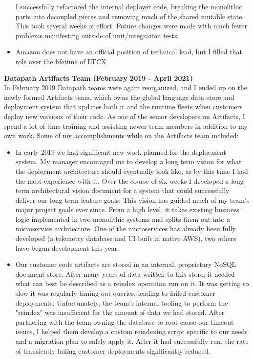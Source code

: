 \documentclass{res}
\begin{document}
\begin{resume}
\begin{itemize}
   I successfully refactored the internal deployer code, breaking the monolithic parts into decoupled pieces and removing much of the shared mutable state.  This took several weeks of effort.  Future changes were made with much fewer problems manifesting outside of unit/integration tests.
   \item Amazon does not have an official position of technical lead, but I filled that role over the lifetime of LTCX
   \end{itemize}
   {\bf Datapath Artifacts Team (February 2019 - April 2021) }\\
   In February 2019 Datapath teams were again reorganized, and I ended up on the newly formed Artifacts team, which owns the global language data store and deployment system that updates both it and the runtime fleets when customers deploy new versions of their code.  As one of the senior developers on Artifacts, I spend a lot of time training and assisting newer team members in addition to my own work.  Some of my accomplishments while on the Artifacts team included:
   \begin{itemize}
   \item In early 2019 we had significant new work planned for the deployment system.  My manager encouraged me to develop a long term vision for what the deployment architecture should eventually look like, as by this time I had the most experience with it.  Over the course of six weeks I developed a long term architectural vision document for a system that could successfully deliver our long term feature goals.  This vision has guided much of my team's major project goals ever since.  From a high level, it takes existing business logic implemented in two monolithic systems and splits them out into a microservice architecture.  One of the microservices has already been fully developed (a telemetry database and UI built in native AWS), two others have begun development this year.
   \item Our customer code artifacts are stored in an internal, proprietary NoSQL document store.  After many years of data written to this store, it needed what can best be described as a reindex operation run on it.  It was getting so slow it was regularly timing out queries, leading to failed customer deployments.  Unfortunately, the team’s internal tooling to perform the "reindex" was insufficient for the amount of data we had stored.  After partnering with the team owning the database to root cause our timeout issues, I helped them develop a custom reindexing script specific to our needs and a migration plan to safely apply it.  After it had successfully run, the rate of transiently failing customer deployments significantly reduced.

\end{itemize}
\end{resume}
\end{document}
